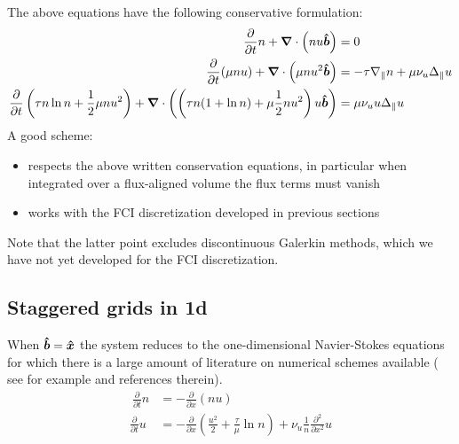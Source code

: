 The above equations have the following conservative formulation:
\begin{align}
    \frac{\partial}{\partial t} n  + {\boldsymbol{\nabla}}\cdot\left( nu \bm{\hat{b}}\right) &= 0 \\
    \frac{\partial}{\partial t} (\mu nu)  + {\boldsymbol{\nabla}}\cdot\left(\mu nu^2 \bm{\hat{b}}\right) &=
    -\tau \nabla_\parallel n + \mu \nu_u \Delta_\parallel u \\
    \frac{\partial}{\partial t} \left(\tau n \ln n + \frac{1}{2}\mu nu^2\right)
    + {\boldsymbol{\nabla}}\cdot\left( \left( \tau n ( 1 + \ln n)  +\mu \frac{1}{2} nu^2\right) u\bm{\hat{b}} \right) &= \mu \nu_u u \Delta_\parallel u
\end{align}
A good scheme:
\begin{itemize}
    \item respects the above written conservation equations, in particular when
        integrated over a flux-aligned volume the flux terms must vanish
    \item works with the FCI discretization developed in previous sections
\end{itemize}
Note that the latter point excludes discontinuous Galerkin methods, which we have not
yet developed for the FCI discretization.
\subsection{Staggered grids in 1d}
When $\bm{\hat{b}} = \bm{\hat{x}}$ the system reduces to the one-dimensional Navier-Stokes equations for which there is a large amount of literature on numerical schemes available
( see for example \cite{LeVeque} and references therein).
\begin{align}
    \
    \frac{\partial}{\partial t} n &= - \frac{\partial}{\partial x}\left( nu\right) \\
    \frac{\partial}{\partial t} u &= - \frac{\partial}{\partial x}\left(\frac{u^2}{2} + \frac{\tau}{\mu} \ln n\right) + \nu_u \frac{1}{n}\frac{\partial^2}{\partial x^2} u
\end{align}

